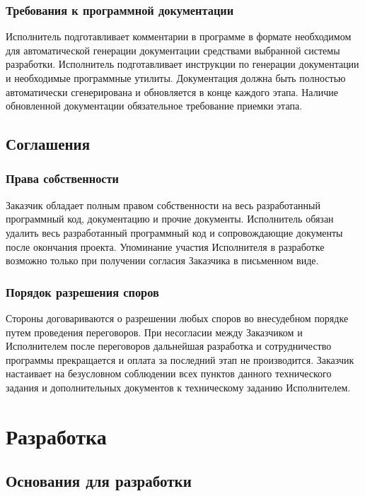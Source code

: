 \subsubsection{Требования к программной документации}

Исполнитель подготавливает комментарии в программе в формате необходимом для автоматической
генерации документации средствами выбранной системы разработки. Исполнитель подготавливает
инструкции по генерации документации и необходимые программные утилиты. Документация должна быть
полностью автоматически сгенерирована и обновляется в конце каждого этапа. Наличие обновленной
документации обязательное требование приемки этапа.

\subsection{Соглашения}

\subsubsection{Права собственности}

Заказчик обладает полным правом собственности на весь разработанный программный код, документацию и
прочие документы. Исполнитель обязан удалить весь разработанный программный код и сопровождающие
документы после окончания проекта. Упоминание участия Исполнителя в разработке возможно только при
получении согласия Заказчика в письменном виде.

\subsubsection{Порядок разрешения споров}

Стороны договариваются о разрешении любых споров во внесудебном порядке путем проведения
переговоров. При несогласии между Заказчиком и Исполнителем после переговоров дальнейшая разработка
и сотрудничество программы прекращается и оплата за последний этап не производится. Заказчик
настаивает на безусловном соблюдении всех пунктов данного технического задания и дополнительных
документов к техническому заданию Исполнителем.

\section{Разработка}

\subsection{Основания для разработки}

